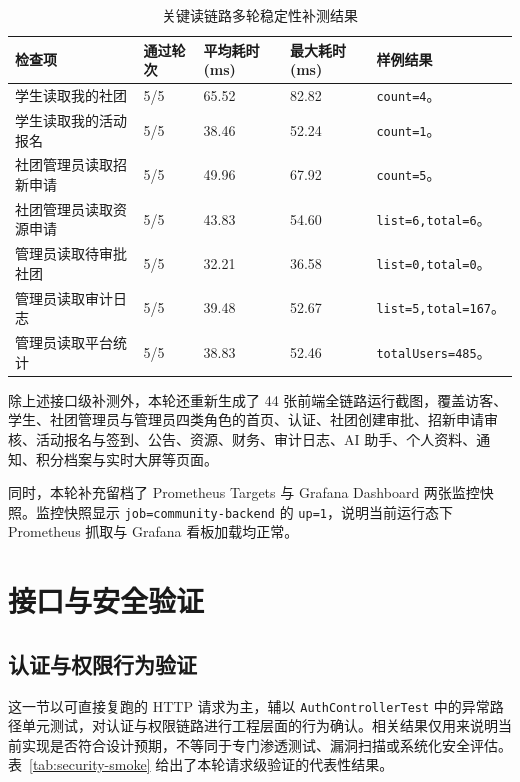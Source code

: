 \begin{table}[H]
\centering
\footnotesize
\caption{关键读链路多轮稳定性补测结果}
\label{tab:read-stability-live}
\setlength{\tabcolsep}{4pt}
\begin{tabular}{p{3.6cm}p{1.2cm}p{1.4cm}p{1.5cm}p{4.0cm}}
\toprule
检查项 & 通过轮次 & 平均耗时(ms) & 最大耗时(ms) & 样例结果 \\
\midrule
学生读取我的社团 & 5/5 & 65.52 & 82.82 & \texttt{count=4}。 \\
学生读取我的活动报名 & 5/5 & 38.46 & 52.24 & \texttt{count=1}。 \\
社团管理员读取招新申请 & 5/5 & 49.96 & 67.92 & \texttt{count=5}。 \\
社团管理员读取资源申请 & 5/5 & 43.83 & 54.60 & \texttt{list=6,total=6}。 \\
管理员读取待审批社团 & 5/5 & 32.21 & 36.58 & \texttt{list=0,total=0}。 \\
管理员读取审计日志 & 5/5 & 39.48 & 52.67 & \texttt{list=5,total=167}。 \\
管理员读取平台统计 & 5/5 & 38.83 & 52.46 & \texttt{totalUsers=485}。 \\
\bottomrule
\end{tabular}
\end{table}

除上述接口级补测外，本轮还重新生成了 44 张前端全链路运行截图，覆盖访客、学生、社团管理员与管理员四类角色的首页、认证、社团创建审批、招新申请审核、活动报名与签到、公告、资源、财务、审计日志、AI 助手、个人资料、通知、积分档案与实时大屏等页面。

同时，本轮补充留档了 Prometheus Targets 与 Grafana Dashboard 两张监控快照。监控快照显示 \texttt{job=community-backend} 的 \texttt{up=1}，说明当前运行态下 Prometheus 抓取与 Grafana 看板加载均正常。

\section{接口与安全验证}

\subsection{认证与权限行为验证}

这一节以可直接复跑的 HTTP 请求为主，辅以 \texttt{AuthControllerTest} 中的异常路径单元测试，对认证与权限链路进行工程层面的行为确认。相关结果仅用来说明当前实现是否符合设计预期，不等同于专门渗透测试、漏洞扫描或系统化安全评估。表~\ref{tab:security-smoke} 给出了本轮请求级验证的代表性结果。

